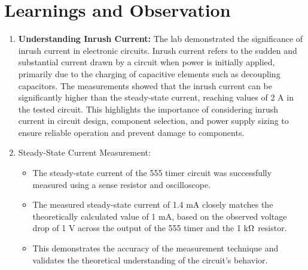 \documentclass[a4paper,11pt]{article}%
\begin{document}
\section{Learnings and Observation}
\begin{enumerate}
	\item \textbf{Understanding Inrush Current:} The lab demonstrated the significance of inrush current in electronic circuits. Inrush current refers to the sudden and substantial current drawn by a circuit when power is initially applied, primarily due to the charging of capacitive elements such as decoupling capacitors. The measurements showed that the inrush current can be significantly higher than the steady-state current, reaching values of 2 A in the tested circuit. This highlights the importance of considering inrush current in circuit design, component selection, and power supply sizing to ensure reliable operation and prevent damage to components.
	\item Steady-State Current Measurement:
	      \begin{itemize}
		      \item The steady-state current of the 555 timer circuit was successfully measured using a sense resistor and oscilloscope.
		      \item The measured steady-state current of 1.4 mA closely matches the theoretically calculated value of 1 mA, based on the observed voltage drop of 1 V across the output of the 555 timer and the 1 k$\ohm$ resistor.
		      \item This demonstrates the accuracy of the measurement technique and validates the theoretical understanding of the circuit's behavior.
	      \end{itemize}




\end{enumerate}
\end{document}
